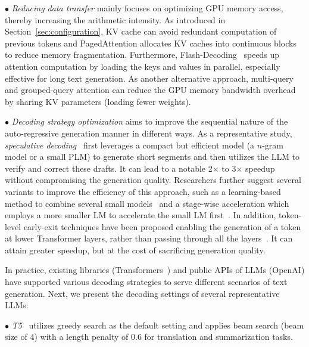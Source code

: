 {$\bullet$ \emph{Reducing data transfer} mainly focuses on optimizing GPU memory access, thereby increasing the arithmetic intensity. As introduced in Section~\ref{sec:configuration}, KV cache can avoid redundant computation of previous tokens and PagedAttention   allocates KV caches into continuous blocks to reduce memory fragmentation. Furthermore, Flash-Decoding~\cite{Dao-stanford-2023-Flash} speeds up attention computation by loading the keys and values in parallel, especially effective for long text generation. As another alternative approach, multi-query and grouped-query attention can reduce the GPU memory bandwidth overhead by sharing KV parameters (loading fewer weights).}

{$\bullet$ \emph{Decoding strategy optimization} aims to improve the sequential nature of the auto-regressive generation manner in different ways. As a representative study, \emph{speculative decoding}~\cite{Yaniv-ICML-2023-Fast,Chen-arxiv-2023-Accelerating} first leverages a compact but efficient model (\eg a $n$-gram model or a small PLM) to generate short segments and then utilizes the LLM to verify and correct these drafts. It can lead to a notable {2$\times$ to 3$\times$ speedup} without  compromising the generation quality.
{Researchers further suggest several variants to improve the efficiency of this approach, such as a learning-based method to combine several small models~\cite{Miao-arxiv-2023-SpecInfer} and a stage-wise acceleration which employs a more smaller LM to accelerate the small LM first~\cite{Spector-2023-arxiv-Accelerating}.
In addition, token-level early-exit techniques have been proposed enabling the generation of a token at lower Transformer layers, rather than passing through all the layers~\cite{Corro-arxiv-2023-SkipDecode}. It can attain greater speedup, but at the cost of sacrificing generation quality.}












In practice, existing libraries (\eg Transformers~\cite{Wolf-EMNLP-2020-Transformers}) and public APIs of LLMs (\eg OpenAI) have supported various decoding strategies to serve different scenarios of text generation. Next, we present the decoding settings of several representative LLMs: 

$\bullet$ \emph{T5}~\cite{Raffel-JMLR-2020-Exploring} utilizes greedy search as the default setting and applies beam search (beam size of 4) with a length penalty {of 0.6} for translation and summarization tasks.

}
